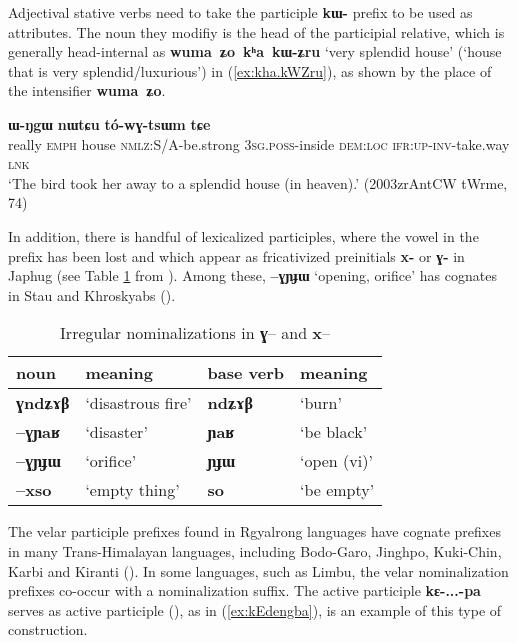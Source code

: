 \documentclass[oneside,a4paper,11pt]{article}
\newcommand{\ipa}[1]{\textbf{{\phon\mbox{#1}}}} %
\begin{document}
Adjectival stative verbs need to take the participle \ipa{kɯ-} prefix to be used as attributes. The noun they modifiy is the head of the participial relative, which is generally head-internal as \ipa{wuma ʑo kʰa kɯ-ʑru} `very splendid house' (`house that is very splendid/luxurious') in (\ref{ex:kha.kWZru}), as shown by the place of the intensifier \ipa{wuma ʑo}.

 \begin{exe}
\ex \label{ex:kha.kWZru}
 \gll  [\ipa{wuma}	\ipa{ʑo}	\ipa{kʰa}	\ipa{kɯ-ʑru}]	\ipa{ɯ-ŋgɯ}	\ipa{nɯtɕu}	\ipa{tó-wɣ-tsɯm}	\ipa{tɕe} \\
 really \textsc{emph} house \textsc{nmlz}:S/A-be.strong \textsc{3sg}.\textsc{poss}-inside \textsc{dem}:\textsc{loc} \textsc{ifr}:\textsc{up}-\textsc{inv}-take.way \textsc{lnk} \\
\glt `The bird took her away to a splendid house (in heaven).' (2003zrAntCW tWrme, 74)
\end{exe}

In addition, there is handful of lexicalized participles, where the vowel in the prefix has been lost and which appear as fricativized preinitials \ipa{x-} or \ipa{ɣ-} in Japhug (see Table \ref{tab:irr.nmlz}  from \citealt[5]{jacques14antipassive}). Among these, \ipa{--ɣɲɟɯ} `opening, orifice'  has cognates in Stau and Khroskyabs (\citealt[609]{jacques17stau}).

\begin{table}[H]
\caption{Irregular nominalizations in \ipa{ɣ}-- and \ipa{x}--} \label{tab:irr.nmlz} \centering
\begin{tabular}{llll}
\toprule
 noun & meaning &base verb & meaning\\
\midrule
\ipa{\textbf{ɣ}ndʑɤβ} & `disastrous fire' & \ipa{ndʑɤβ} & `burn' \\
\ipa{--\textbf{ɣ}ɲaʁ}   &`disaster'& \ipa{ɲaʁ} & `be black' \\
\ipa{--\textbf{ɣ}ɲɟɯ}   & `orifice' & \ipa{ɲɟɯ} &  `open (vi)' \\
\ipa{--\textbf{x}so}   &  `empty thing' &\ipa{so} & `be empty' \\
\bottomrule
\end{tabular}
\end{table}


The velar participle prefixes found in Rgyalrong languages have cognate prefixes in many Trans-Himalayan languages, including Bodo-Garo, Jinghpo, Kuki-Chin, Karbi and Kiranti (\citealt{konnerth16gV, delancey15adjectival}).   In some languages, such as Limbu, the velar nominalization prefixes co-occur with a nominalization suffix. The active participle \ipa{kɛ-...-pa} serves as active participle (\citealt[199-202]{driem87}), as in (\ref{ex:kEdengba}), is an example of this type of construction.
\end{document}
